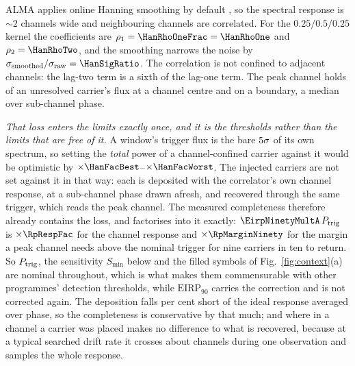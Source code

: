 ALMA applies online Hanning smoothing by default \citep{ALMAHandbook}, so
the spectral response is ${\sim}2$ channels wide and neighbouring channels
are correlated. For the $0.25/0.5/0.25$ kernel the coefficients
are $\rho_1=\HanRhoOneFrac=\HanRhoOne$ and $\rho_2=\HanRhoTwo$, and the
smoothing narrows the noise by
$\sigma_{\rm smoothed}/\sigma_{\rm raw}=\HanSigRatio$. The correlation is
not confined to adjacent channels: the lag-two term is a sixth of the
lag-one term. The peak
channel holds \HanBest{} of an unresolved carrier's flux at a channel centre
and \HanWorst{} on a boundary, a median \HanMed{} over sub-channel phase.

\emph{That loss enters the limits exactly once, and it is the thresholds
rather than the limits that are free of it.} A window's trigger flux is the
bare $5\sigma$ of its own spectrum, so setting the \emph{total}
power of a channel-confined carrier against it would be optimistic by
$\times\HanFacBest$--$\times\HanFacWorst$. The injected carriers are not set
against it in that way: each is deposited with the correlator's own channel
response, at a sub-channel phase drawn afresh, and recovered through the same
trigger, which reads the peak channel. The measured completeness therefore
already contains the loss, and factorises into it exactly:
$\EirpNinetyMultA\,P_{\rm trig}$ is $\times\RpRespFac$ for the channel
response and $\times\RpMarginNinety$ for the margin a peak channel needs
above the nominal trigger for nine carriers in ten to return. So
$P_{\rm trig}$, the sensitivity $S_{\min}$ below and the filled symbols of
Fig.~\ref{fig:context}(a) are nominal throughout, which is what makes them
commensurable with other programmes' detection thresholds, while
$\mathrm{EIRP}_{90}$ carries the correction and is not corrected again.
The deposition falls \InjShortPct{} per cent short of the ideal response
averaged over phase, so the completeness is conservative by that much; and
where in a channel a carrier was placed makes no difference to what is
recovered, because at a typical searched drift rate it crosses about
\InjDriftChan{} channels during one observation and samples the whole
response.

